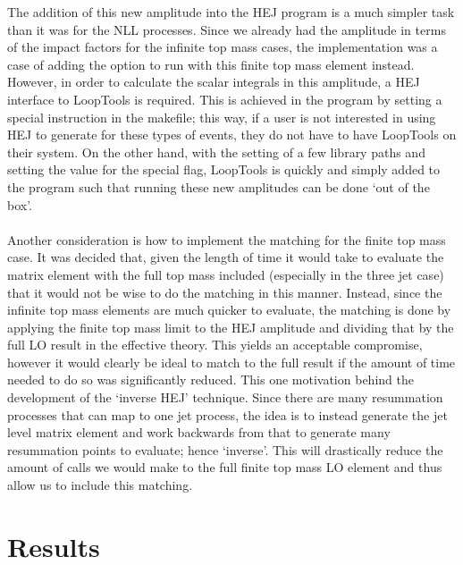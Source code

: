 The addition of this new amplitude into the HEJ program is a much simpler task than it was for the NLL processes. Since we already had the amplitude in terms of the impact factors for the infinite top mass cases, the implementation was a case of adding the option to run with this finite top mass element instead. However, in order to calculate the scalar integrals in this amplitude, a HEJ interface to LoopTools is required. This is achieved in the program by setting a special instruction in the makefile; this way, if a user is not interested in using HEJ to generate for these types of events, they do not have to have LoopTools on their system. On the other hand, with the setting of a few library paths and setting the value for the special flag, LoopTools is quickly and simply added to the program such that running these new amplitudes can be done `out of the box'. \\
\\
Another consideration is how to implement the matching for the finite top mass case. It was decided that, given the length of time it would take to evaluate the matrix element with the full top mass included (especially in the three jet case) that it would not be wise to do the matching in this manner. Instead, since the infinite top mass elements are much quicker to evaluate, the matching is done by applying the finite top mass limit to the HEJ amplitude and dividing that by the full LO result in the effective theory. This yields an acceptable compromise, however it would clearly be ideal to match to the full result if the amount of time needed to do so was significantly reduced. This one motivation behind the development of the `inverse HEJ' technique. Since there are many resummation processes that can map to one jet process, the idea is to instead generate the jet level matrix element and work backwards from that to generate many resummation points to evaluate; hence `inverse'. This will drastically reduce the amount of calls we would make to the full finite top mass LO element and thus allow us to include this matching. 

\section{Results}


